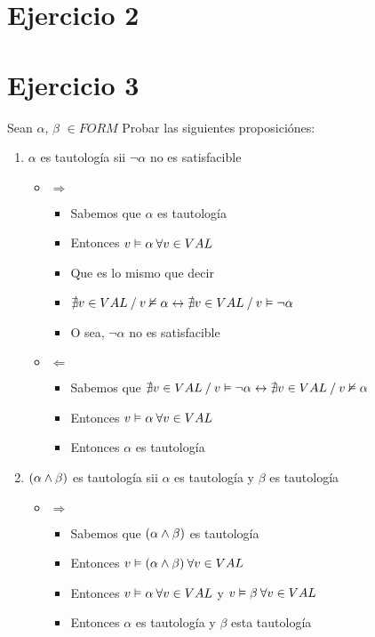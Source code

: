 \documentclass[14pt,a4paper,fleqn]{article}
\begin{document}
\section*{Ejercicio 2}
\section*{Ejercicio 3}
Sean $\alpha$, $\beta$ $\in FORM$ Probar las siguientes proposiciónes:
\begin{enumerate}
	\item $\alpha$ es tautología sii $\neg \alpha$ no es satisfacible
	\begin{itemize}
		 \item $\Rightarrow$
		 \begin{itemize}
		 	 \item Sabemos que $\alpha$ es tautología
		 	 \item Entonces $v \vDash \alpha \: \forall v \in VAL $
		 	 \item Que es lo mismo que decir
		 	 \item $\nexists v \in VAL  \: / \: v \nvDash \alpha \leftrightarrow \nexists v \in VAL  \: / \: v \vDash \neg \alpha$
		 	 \item O sea, $\neg \alpha$ no es satisfacible
		 \end{itemize}
		 \item $\Leftarrow$
		 \begin{itemize}
		 	\item Sabemos que $\nexists v \in VAL  \: / \: v \vDash \neg \alpha \leftrightarrow \nexists v \in VAL  \: / \: v \nvDash \alpha$
		 	\item Entonces $v \vDash \alpha \: \forall v \in VAL $
		  	\item Entonces $\alpha$ es tautología
		 \end{itemize}
	\end{itemize}
	\item $(\alpha \wedge \beta)$ es tautología sii $\alpha$ es tautología y $\beta$ es tautología
	\begin{itemize}
		\item $\Rightarrow$
		\begin{itemize}
			\item Sabemos que $(\alpha \wedge \beta)$ es tautología
			\item Entonces $v \vDash (\alpha \wedge \beta) \: \forall v \in VAL $
			\item Entonces $v \vDash \alpha \: \forall v \in VAL $ y $v \vDash \beta \: \forall v \in VAL $
			\item Entonces $\alpha$ es tautología y $\beta$ esta tautología

\end{itemize}
\end{itemize}
\end{enumerate}
\end{document}
